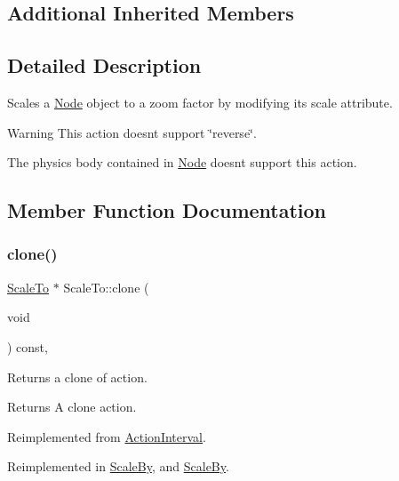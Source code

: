 \subsection*{Additional Inherited Members}


\subsection{Detailed Description}
Scales a \hyperlink{classNode}{Node} object to a zoom factor by modifying it\textquotesingle{}s scale attribute. 

\begin{DoxyWarning}{Warning}
This action doesn\textquotesingle{}t support \char`\"{}reverse\char`\"{}. 

The physics body contained in \hyperlink{classNode}{Node} doesn\textquotesingle{}t support this action. 
\end{DoxyWarning}


\subsection{Member Function Documentation}
\mbox{\label{classScaleTo_a02707ca35819eabf4cc14909fec9a348}} 
\subsubsection{\texorpdfstring{clone()}{clone()}\hspace{0.1cm}{\footnotesize\ttfamily [1/2]}}
{\footnotesize\ttfamily \hyperlink{classScaleTo}{Scale\+To} $\ast$ Scale\+To\+::clone (\begin{DoxyParamCaption}\item[{void}]{ }\end{DoxyParamCaption}) const\hspace{0.3cm}{\ttfamily [override]}, {\ttfamily [virtual]}}

Returns a clone of action.

\begin{DoxyReturn}{Returns}
A clone action. 
\end{DoxyReturn}


Reimplemented from \hyperlink{classActionInterval_abc93ce0c2f54a90eb216a7803f25f44a}{Action\+Interval}.



Reimplemented in \hyperlink{classScaleBy_abce00bc9338d8fc1fe3a765b62947d1d}{Scale\+By}, and \hyperlink{classScaleBy_a70d07c840c1ad6582695497afe970446}{Scale\+By}.

